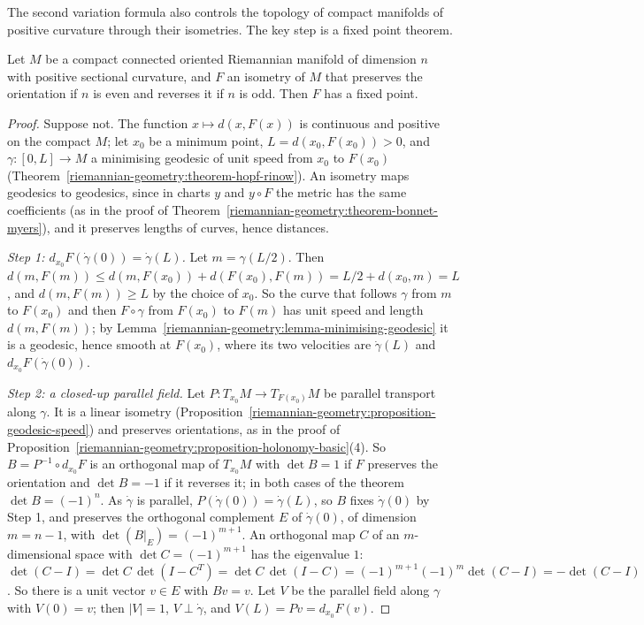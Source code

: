 The second variation formula also controls the topology of compact manifolds of positive curvature through their isometries. The key step is a fixed point theorem.

\begin{theorem}[Weinstein]\label{riemannian-geometry:theorem-weinstein}
Let $M$ be a compact connected oriented Riemannian manifold of dimension $n$ with positive sectional curvature, and $F$ an isometry of $M$ that preserves the
orientation if $n$ is even and reverses it if $n$ is odd. Then $F$ has a fixed point.
\end{theorem}

\begin{proof}
Suppose not. The function $x \mapsto d(x, F(x))$ is continuous and positive on the compact $M$; let $x_0$ be a minimum point, $L = d(x_0, F(x_0)) > 0$, and
$\gamma \colon [0, L] \to M$ a minimising geodesic of unit speed from $x_0$ to $F(x_0)$ (Theorem~\ref{riemannian-geometry:theorem-hopf-rinow}). An isometry maps geodesics to
geodesics, since in charts $y$ and $y \circ F$ the metric has the same coefficients (as in the proof of Theorem~\ref{riemannian-geometry:theorem-bonnet-myers}), and it
preserves lengths of curves, hence distances.

\emph{Step 1: $d_{x_0}F(\dot\gamma(0)) = \dot\gamma(L)$.} Let $m = \gamma(L/2)$. Then
$d(m, F(m)) \leq d(m, F(x_0)) + d(F(x_0), F(m)) = L/2 + d(x_0, m) = L$, and $d(m, F(m)) \geq L$ by the choice of $x_0$. So the curve that follows $\gamma$ from $m$ to $F(x_0)$
and then $F \circ \gamma$ from $F(x_0)$ to $F(m)$ has unit speed and length $d(m, F(m))$; by Lemma~\ref{riemannian-geometry:lemma-minimising-geodesic} it is a geodesic,
hence smooth at $F(x_0)$, where its two velocities are $\dot\gamma(L)$ and $d_{x_0}F(\dot\gamma(0))$.

\emph{Step 2: a closed-up parallel field.} Let $P \colon T_{x_0}M \to T_{F(x_0)}M$ be parallel transport along $\gamma$. It is a linear isometry
(Proposition~\ref{riemannian-geometry:proposition-geodesic-speed}) and preserves orientations, as in the proof of
Proposition~\ref{riemannian-geometry:proposition-holonomy-basic}(4). So $B = P^{-1} \circ d_{x_0}F$ is an orthogonal map of $T_{x_0}M$ with $\det B = 1$ if $F$ preserves the
orientation and $\det B = -1$ if it reverses it; in both cases of the theorem $\det B = (-1)^n$. As $\dot\gamma$ is parallel, $P(\dot\gamma(0)) = \dot\gamma(L)$, so $B$ fixes
$\dot\gamma(0)$ by Step 1, and preserves the orthogonal complement $E$ of $\dot\gamma(0)$, of dimension $m = n - 1$, with $\det(B|_E) = (-1)^{m+1}$. An orthogonal map $C$ of an
$m$-dimensional space with $\det C = (-1)^{m+1}$ has the eigenvalue $1$:
$\det(C - I) = \det C\,\det(I - C^T) = \det C\,\det(I - C) = (-1)^{m+1}(-1)^m\det(C - I) = -\det(C - I)$. So there is a unit vector $v \in E$ with $Bv = v$. Let $V$ be the parallel
field along $\gamma$ with $V(0) = v$; then $|V| = 1$, $V \perp \dot\gamma$, and $V(L) = Pv = d_{x_0}F(v)$.


\end{proof}
